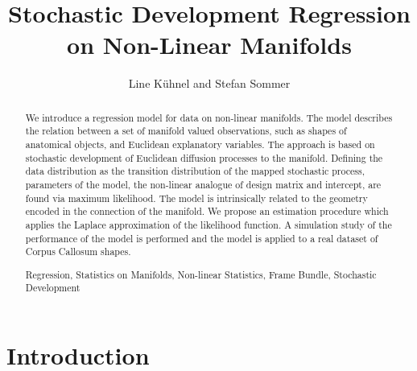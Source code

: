 \documentclass[runningheads,a4paper]{llncs}
\newcommand{\keywords}[1]{\par\addvspace\baselineskip\noindent\keywordname\enspace\ignorespaces#1}
\begin{document}
\mainmatter

\title{Stochastic Development Regression on Non-Linear Manifolds}

\author{Line K\"uhnel and Stefan Sommer}

\maketitle

\begin{abstract}
We introduce a regression model for data on non-linear manifolds. The 
model describes the relation between a set of manifold valued 
observations, such as shapes of anatomical objects, and Euclidean 
explanatory variables. The approach is based on stochastic development 
of Euclidean diffusion processes to the manifold. Defining the data 
distribution as the transition distribution of the mapped stochastic 
process, parameters of the model, the non-linear analogue of design 
matrix and intercept, are found via maximum likelihood. The model is 
intrinsically related to the geometry encoded in the connection of the 
manifold. We propose an estimation procedure which applies the Laplace approximation of the likelihood function. A simulation study of the performance of the model is performed and the model is applied to a real dataset of Corpus Callosum shapes.
\keywords{Regression, Statistics on Manifolds, Non-linear Statistics, Frame Bundle, Stochastic Development}
\end{abstract}

\section{Introduction}

\end{document}
